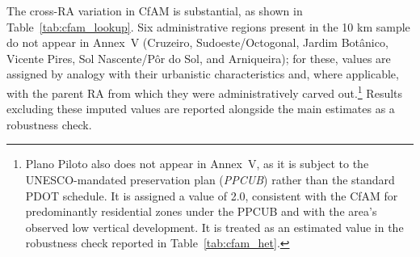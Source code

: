 The cross-RA variation in CfAM is substantial, as shown in Table~\ref{tab:cfam_lookup}. Six administrative regions present in the 10 km sample do not appear in Annex~V (Cruzeiro, Sudoeste/Octogonal, Jardim Botânico, Vicente Pires, Sol Nascente/Pôr do Sol, and Arniqueira); for these, values are assigned by analogy with their urbanistic characteristics and, where applicable, with the parent RA from which they were administratively carved out.\footnote{Plano Piloto also does not appear in Annex~V, as it is subject to the UNESCO-mandated preservation plan (\emph{PPCUB}) rather than the standard PDOT schedule. It is assigned a value of 2.0, consistent with the CfAM for predominantly residential zones under the PPCUB and with the area's observed low vertical development. It is treated as an estimated value in the robustness check reported in Table~\ref{tab:cfam_het}.} Results excluding these imputed values are reported alongside the main estimates as a robustness check.

